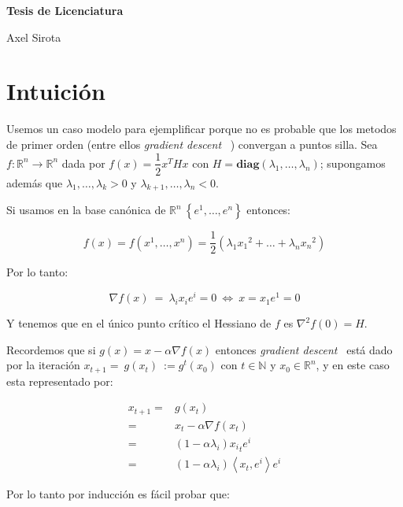 \documentclass[11pt]{book}
\newcommand{\R}{{\mathbb{R}}}
\newcommand{\N}{{\mathbb{N}}}
\newcommand{\ip}[1]{\left\langle#1\right\rangle}
\newcommand{\sett}[1]{\left\lbrace#1\right\rbrace}
\numberwithin{theorem}{subsection}
\newcommand{\dg}{\textit{gradient descent} \ }
\begin{document}
	
	\pagestyle{empty}
	\pagestyle{fancy}
	\fancyfoot[CO]{\slshape \thepage}
	\renewcommand{\headrulewidth}{0pt}
	
	
	
	\centerline{\bf Tesis de Licenciatura}
	\centerline{\sc Axel Sirota}
	
	\tableofcontents
	\newpage

\chapter{Intuici\'on}

Usemos un caso modelo para ejemplificar porque no es probable que los metodos de primer orden (entre ellos \dg) convergan a puntos silla. Sea $f: \R^n \rightarrow \R^n$ dada por $f(x) = \dfrac{1}{2} x^THx$ con $H = \textbf{diag}\left(\lambda_1, \dots, \lambda_n\right)$; supongamos adem\'as que $\lambda_1, \dots, \lambda_k > 0$ y $\lambda_{k+1}, \dots, \lambda_n <0$.


Si usamos en la base can\'onica de $\R^n \ \sett{e^1, \dots, e^n}$ entonces:

\begin{equation*}
	f(x) = f(x^1, \dots, x^n) = \dfrac{1}{2} \left(\lambda_1 {x_1}^2 + \dots + \lambda_n {x_n}^2\right)
\end{equation*}

Por lo tanto:

\begin{equation*}
\nabla f (x) \ = \ \lambda_i x_i e^i = 0 \ \Longleftrightarrow \ x = x_1 e^1 = 0
\end{equation*}


Y tenemos que en el \'unico punto cr\'itico el Hessiano de $f$ es $\nabla^2 f (0) =  H$.

Recordemos que si $g(x) = x - \alpha  \nabla f(x)$ entonces \dg  est\'a dado por la iteraci\'on $x_{t+1} = \ g(x_t) \ := g^t(x_0)$ con $t \in \N$ y $x_0 \in \R^n$, y en este caso esta representado por:

\begin{equation*}
\begin{aligned}
x_{t+1} = & g(x_t) \\
= & x_t - \alpha\nabla f(x_t) \\
= & \left(1 - \alpha\lambda_i\right){x_i}_te^i \\
= & \left(1 - \alpha\lambda_i\right)\ip{x_t, e^i}e^i
\end{aligned}
\end{equation*}

Por lo tanto por inducci\'on es f\'acil probar que:
\end{document}
